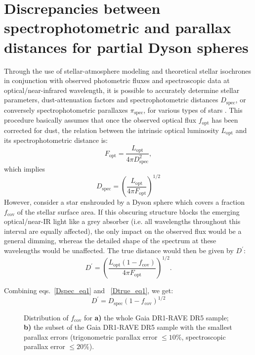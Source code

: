 \documentclass[twocolumn]{aastex6}
\begin{document}
\section{Discrepancies between spectrophotometric and parallax distances for partial Dyson spheres}
\label{discrepancy}
Through the use of stellar-atmosphere modeling and theoretical stellar isochrones in conjunction with observed photometric fluxes and spectroscopic data at optical/near-infrared wavelength, it is possible to accurately determine stellar parameters, dust-attenuation factors and spectrophotometric distances $D_\mathrm{spec}$, or conversely spectrophotometric parallaxes $\pi_\mathrm{spec}$, for various types of stars \citep[e.g][]{Binney14}. This procedure basically assumes that once the observed optical flux $f_\mathrm{opt}$ has been corrected for dust, the relation between the intrinsic optical luminosity $L_\mathrm{opt}$ and its spectrophotometric distance is:
\begin{equation}
F_\mathrm{opt} = \frac{L_\mathrm{opt}}{4\pi D_\mathrm{spec}^2},
\label{Fopt_eq1}
\end{equation} 
which implies 
\begin{equation}
D_\mathrm{spec} = \left( \frac{L_\mathrm{opt}}{4\pi F_\mathrm{opt}} \right)^{1/2}
\label{Dspec_eq1}
\end{equation}
However, consider a star enshrouded by a Dyson sphere which covers a fraction $f_\mathrm{cov}$ of the stellar surface area. If this obscuring structure blocks the emerging optical/near-IR light like a grey absorber (i.e. all wavelengths throughout this interval are equally affected), the only impact on the observed flux would be a general dimming, whereas the detailed shape of the spectrum at these wavelengths would be unaffected. The true distance would then be given by $D^\prime$:
\begin{equation}
D^\prime = \left( \frac{L_\mathrm{opt}(1-f_\mathrm{cov})}{4\pi F_\mathrm{opt}} \right)^{1/2}.
\label{Dtrue_eq1}
\end{equation}

Combining eqs.~\ref{Dspec_eq1} and ~\ref{Dtrue_eq1}, we get:
\begin{equation}
D^\prime  = D_\mathrm{spec} (1-f_\mathrm{cov})^{1/2}
\label{Dtrue_eq2}
\end{equation}

\begin{figure}[t]
\caption{Distribution of $f_\mathrm{cov}$ for {\bf a)} the whole Gaia DR1-RAVE DR5 sample; {\bf b)} the subset of the Gaia DR1-RAVE DR5 sample with the smallest parallax errors (trigonometric parallax error $\leq 10\%$, spectroscopic parallax error $\leq 20\%$).}
\label{fig_fcov_dist}
\end{figure}
\end{document}
